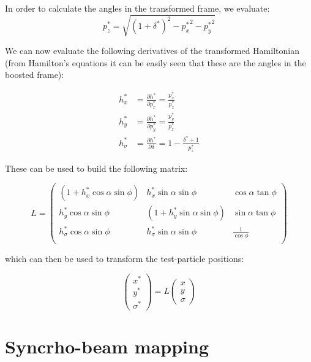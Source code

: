 In order to calculate the angles in the transformed frame, we evaluate:
\begin{equation}
p^*_z  =  \sqrt{\left(1+\delta^*\right)^2-{p_x^*}^2-{p_y^*}^2}
\end{equation}

We can now evaluate the following derivatives of the transformed Hamiltonian (from Hamilton's equations it can be easily seen that these are the angles in the boosted frame):

\begin{align}
h^*_x &= \frac{\partial h^*}{\partial p^*_x} = \frac{p^*_x}{p^*_z}\\
h^*_y &= \frac{\partial h^*}{\partial p^*_y} = \frac{p^*_y}{p^*_z}\\
h^*_\sigma &= \frac{\partial h^*}{\partial \delta} = 1-\frac{\delta^*+1}{p^*_z}
\end{align}

These can be used to build the following matrix:

\begin{equation}
L  =\left( \begin{matrix}

\left( 1 + h^*_x \cos \alpha \sin \phi\right) & h^*_x \sin \alpha \sin \phi & \cos \alpha \tan \phi \\
h_y^* \cos \alpha \sin \phi & \left( 1 + h^*_y \sin \alpha \sin \phi\right) & \sin \alpha \tan \phi\\
h_\sigma^* \cos \alpha \sin \phi & h_\sigma^* \sin \alpha \sin \phi  & \frac{1}{\cos \phi}\\
\end{matrix} \right)
\label{eq:Lmat}
\end{equation}

which can then be used to transform the test-particle positions:

\begin{equation}
\left( \begin{matrix}
x^*\\
y^*\\
\sigma^*
\end{matrix}\right) = 
L 
\left( \begin{matrix}
x\\
y\\
\sigma
\end{matrix}\right)
\end{equation}


\section{Syncrho-beam mapping}

